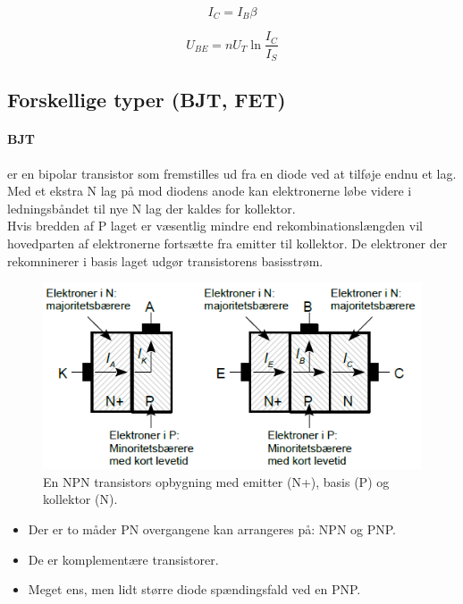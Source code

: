 \documentclass[danish]{article}
\begin{document}
\begin{equation}
I_C = I_B {\beta}
\end{equation}

\begin{equation}
U_{BE} = n U_T \ln \dfrac{I_C}{I_S}
\end{equation}

\subsection{Forskellige typer (BJT, FET)}

\paragraph{BJT} er en bipolar transistor som fremstilles ud fra en diode ved at tilføje endnu et lag. 
Med et ekstra N lag på mod diodens anode kan elektronerne løbe videre i ledningsbåndet til nye N lag der kaldes for kollektor.\\
 
Hvis bredden af P laget er væsentlig mindre end rekombinationslængden vil hovedparten af elektronerne fortsætte fra emitter til kollektor.
De elektroner der rekomninerer i basis laget udgør transistorens basisstrøm. 

\begin{figure} [H]
	\centering
	\includegraphics[width=0.95\linewidth]{graphics/bjt}
	\caption{En NPN transistors opbygning med emitter (N+), basis (P) og kollektor (N).}
	\label{fig:bjt}
\end{figure}

\begin{itemize}
	\item Der er to måder PN overgangene kan arrangeres på: NPN og PNP.
	\item De er komplementære transistorer.
	\item Meget ens, men lidt større diode spændingsfald ved en PNP.
\end{itemize}
\end{document}
